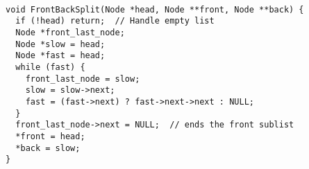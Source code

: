 \begin{verbatim}
               
void FrontBackSplit(Node *head, Node **front, Node **back) {
  if (!head) return;  // Handle empty list
  Node *front_last_node;
  Node *slow = head;
  Node *fast = head;
  while (fast) {
    front_last_node = slow;
    slow = slow->next;
    fast = (fast->next) ? fast->next->next : NULL;
  }
  front_last_node->next = NULL;  // ends the front sublist
  *front = head;
  *back = slow;
}
\end{verbatim}
